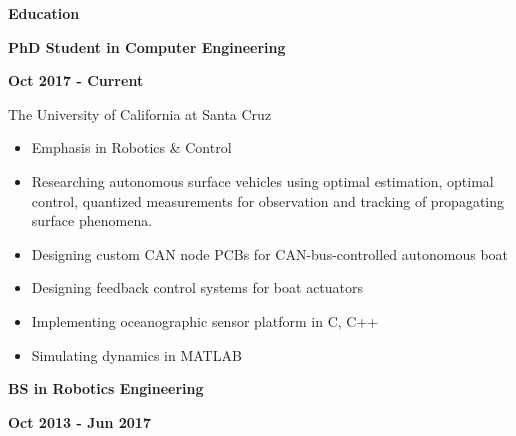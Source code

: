 \documentclass[paper=a4,fontsize=11pt]{article} %
\def \sectionSpace      {0.7cm}     %
\def \subSectionSpace   {0.3cm}     %
\def \leftColSpace      {0.12}      %
\def \middleColSpace    {0.675}     %
\def \bigMiddleColSpace {0.875}     %
\def \rightColSpace     {0.25}      %
\begin{document}
    \vspace{\sectionSpace}

    \noindent
    \begin{minipage}[t]{\leftColSpace\linewidth}
        \noindent \textbf{Education}
    \end{minipage}
    \begin{minipage}[t]{\middleColSpace\linewidth}
        \noindent \textbf{PhD Student in Computer Engineering}
    \end{minipage}
    \begin{minipage}[t]{\rightColSpace\linewidth}
        \noindent \textbf{Oct 2017 - Current}
    \end{minipage}
    \begin{minipage}[t]{\leftColSpace\linewidth}
        \hfill
    \end{minipage}
    \begin{minipage}[t]{\bigMiddleColSpace\linewidth}
        \noindent The University of California at Santa Cruz
        \begin{itemize}[noitemsep,topsep=0pt]
            \item Emphasis in Robotics \& Control
            \item Researching autonomous surface vehicles using optimal estimation, optimal control, quantized measurements for observation and tracking of propagating surface phenomena.
            \item Designing custom CAN node PCBs for CAN-bus-controlled autonomous boat
            \item Designing feedback control systems for boat actuators
            \item Implementing oceanographic sensor platform in C, C++
            \item Simulating dynamics in MATLAB
        \end{itemize}
    \end{minipage}

    \noindent
    \begin{minipage}[t]{\leftColSpace\linewidth}
        \hfill
    \end{minipage}
    \begin{minipage}[t]{\middleColSpace\linewidth}
        \vspace{\subSectionSpace}
        \noindent \textbf{BS in Robotics Engineering}
    \end{minipage}
    \begin{minipage}[t]{\rightColSpace\linewidth}
        \vspace{\subSectionSpace}
        \noindent \textbf{Oct 2013 - Jun 2017}
    \end{minipage}
\end{document}
